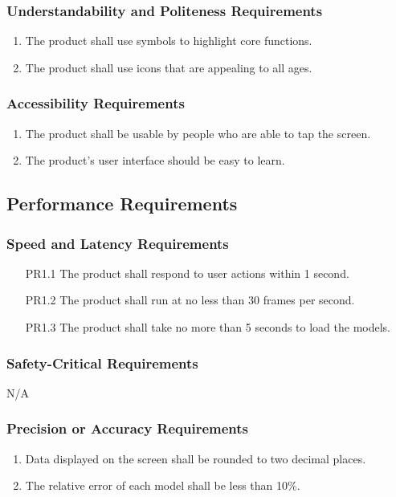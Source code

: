 \documentclass{article}
\begin{document}
\subsubsection{Understandability and Politeness Requirements}
\begin{enumerate}[UH4.1]
    \item The product shall use symbols to highlight core functions.
    \item The product shall use icons that are appealing to all ages.
\end{enumerate}
\subsubsection{Accessibility Requirements}
\begin{enumerate}[UH5.1]
    \item The product shall be usable by people who are able to tap the screen.
    \item The product's user interface should be easy to learn.
\end{enumerate}
\subsection{Performance Requirements}
\subsubsection{Speed and Latency Requirements}
\begin{enumerate}
    \item[PR1.1] The product shall respond to user actions within 1 second.
    \item[PR1.2] The product shall run at no less than 30 frames per second.
    \item[PR1.3] The product shall take no more than 5 seconds to load the models.
\end{enumerate}
\subsubsection{Safety-Critical Requirements}
N/A
\subsubsection{Precision or Accuracy Requirements}
\begin{enumerate}[PR3.1]
    \item Data displayed on the screen shall be rounded to two decimal places.
    \item The relative error of each model shall be less than 10\%.
\end{enumerate}
\end{document}
